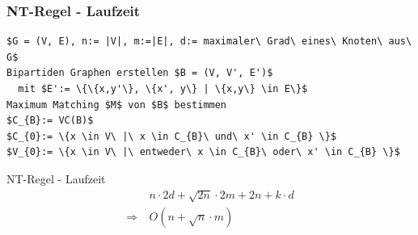 \documentclass{beamer}
\begin{document}
\begin{frame}[fragile]
\frametitle{NT-Regel - Laufzeit}
\begin{lstlisting}[mathescape = true, basicstyle=\ttfamily]
$G = (V, E), n:= |V|, m:=|E|, d:= maximaler\ Grad\ eines\ Knoten\ aus\ G$
Bipartiden Graphen erstellen $B = (V, V', E')$ 
  mit $E':= \{\{x,y'\}, \{x', y\} | \{x,y\} \in E\}$ 
Maximum Matching $M$ von $B$ bestimmen 
$C_{B}:= VC(B)$ 
$C_{0}:= \{x \in V\ |\ x \in C_{B}\ und\ x' \in C_{B} \}$ 
$V_{0}:= \{x \in V\ |\ entweder\ x \in C_{B}\ oder\ x' \in C_{B} \}$ 
\end{lstlisting}
\end{frame}
\begin{frame}{NT-Regel - Laufzeit}
\begin{align*}
&\ n \cdot 2d + \sqrt{2n} \cdot 2m + 2n + k \cdot d\\  
\Rightarrow &\ O(n + \sqrt{n} \cdot m)
\end{align*}
\end{frame}
\end{document}
